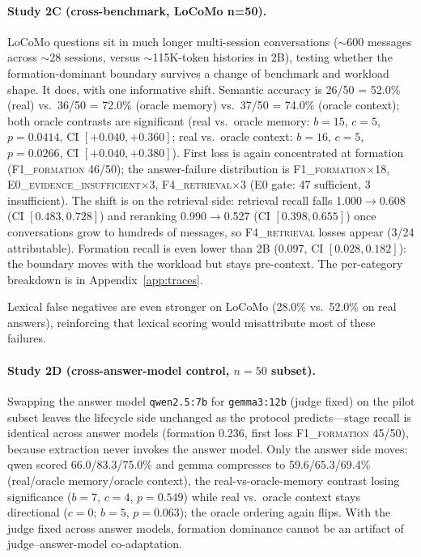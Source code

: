 \documentclass[11pt]{article}
\newcommand{\fone}{F1\textsc{\_formation}}
\newcommand{\ffour}{F4\textsc{\_retrieval}}
\newcommand{\ezero}{E0\textsc{\_evidence\_insufficient}}
\begin{document}
\paragraph{Study 2C (cross-benchmark, LoCoMo n=50).}
LoCoMo questions sit in much longer multi-session conversations
($\sim$600 messages across $\sim$28 sessions, versus $\sim$115K-token
histories in 2B), testing whether the formation-dominant boundary
survives a change of benchmark and workload shape. It does, with one
informative shift. Semantic accuracy is
26/50 = 52.0\% (real) vs.\ 36/50 = 72.0\% (oracle memory) vs.\
37/50 = 74.0\% (oracle context); both oracle contrasts are significant
(real vs.\ oracle memory: $b{=}15$, $c{=}5$, $p{=}0.0414$, CI
$[+0.040, +0.360]$; real vs.\ oracle context: $b{=}16$, $c{=}5$,
$p{=}0.0266$, CI $[+0.040, +0.380]$). First loss is again concentrated
at formation (\fone{} 46/50); the answer-failure distribution is
\fone{}$\times$18, \ezero{}$\times$3, \ffour{}$\times$3 (E0 gate: 47
sufficient, 3 insufficient). The shift is on the retrieval side:
retrieval recall falls 1.000$\to$0.608 (CI $[0.483, 0.728]$) and
reranking 0.990$\to$0.527 (CI $[0.398, 0.655]$) once conversations grow
to hundreds of messages, so \ffour{} losses appear (3/24 attributable).
Formation recall is even lower than 2B (0.097, CI $[0.028, 0.182]$):
the boundary moves with the workload but stays pre-context. The
per-category breakdown is in Appendix~\ref{app:traces}.

Lexical false negatives are even stronger on LoCoMo (28.0\% vs.\ 52.0\%
on real answers), reinforcing that lexical scoring would misattribute
most of these failures.

\paragraph{Study 2D (cross-answer-model control, $n{=}50$ subset).}
Swapping the answer model \texttt{qwen2.5:7b} for \texttt{gemma3:12b}
(judge fixed) on the pilot subset leaves the lifecycle side unchanged
as the protocol predicts---stage recall is identical across answer
models (formation 0.236, first loss \fone{} 45/50), because extraction
never invokes the answer model. Only the answer side
moves: qwen scored 66.0/83.3/75.0\% and gemma compresses to
59.6/65.3/69.4\% (real/oracle memory/oracle context), the
real-vs-oracle-memory contrast losing significance ($b{=}7$, $c{=}4$,
$p{=}0.549$) while real vs.\ oracle context stays directional ($c{=}0$;
$b{=}5$, $p{=}0.063$); the oracle ordering again flips. With the judge
fixed across answer models, formation dominance cannot be an artifact of
judge--answer-model co-adaptation.
\end{document}
